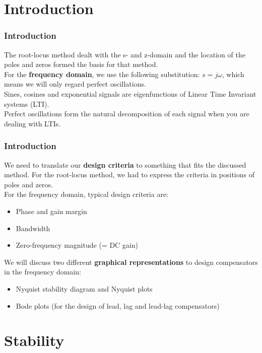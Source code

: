 \section{Introduction}

\begin{frame}
	\frametitle{Introduction}
	\vspace{-10ex}
	The root-locus method dealt with the s- and z-domain and the location of the poles and zeros formed the basis for that method.\\
	\medskip
	For the \textbf{frequency domain}, we use the following substitution: $s=j\omega$, which means we will only regard perfect oscillations.\\
	\medskip
	Sines, cosines and exponential signals are eigenfunctions of Linear Time Invariant systems (LTI).\\
	Perfect oscillations form the natural decomposition of each signal when you are dealing with LTIs.
\end{frame}

\begin{frame}
	\frametitle{Introduction}
	We need to translate our \textbf{design criteria} to something that fits the discussed method. For the root-locus method, we had to express the criteria in positions of poles and zeros.\\
	For the frequency domain, typical design criteria are:
	\begin{itemize}
		\item Phase and gain margin
		\item Bandwidth
		\item Zero-frequency magnitude (= DC gain)
	\end{itemize}
	\bigskip
	We will discuss two different \textbf{graphical representations} to design compensators in the frequency domain:
	\begin{itemize}
		\item Nyquist stability diagram and Nyquist plots
		\item Bode plots (for the design of lead, lag and lead-lag compensators)
	\end{itemize}
\end{frame}

\section{Stability}

